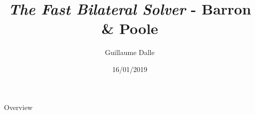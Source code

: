 \documentclass{beamer}
\title[The Fast Bilateral Solver]{\textit{The Fast Bilateral Solver}
- Barron \& Poole}
\author{Guillaume Dalle}
\institute{MVA - Imagerie numérique}
\date{16/01/2019}
\begin{document}
\begin{frame}
\titlepage
\end{frame}

\begin{frame}{Overview}
\tableofcontents
\end{frame}
\end{document}
